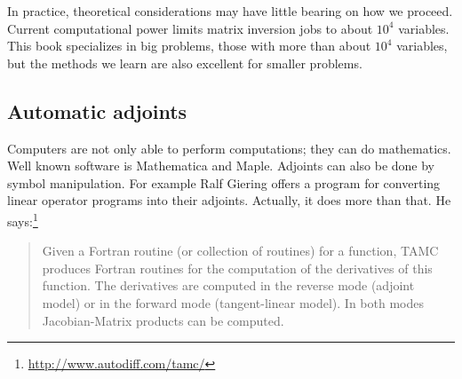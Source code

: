 \par
In practice, theoretical considerations may have little
bearing on how we proceed.
Current computational power limits matrix inversion
jobs to about $10^4$ variables.
This book specializes in big problems,
those with more than about $10^4$ variables,
but the methods we learn are also excellent for smaller problems.

\subsection{Automatic adjoints}
Computers are not only able to perform computations; they can do
mathematics.  Well known software is Mathematica and Maple.  Adjoints
can also be done by symbol manipulation.  For example
Ralf Giering
offers a program for converting linear operator programs into their
adjoints.
Actually, it does more than that.
He says:\footnote{\url{http://www.autodiff.com/tamc/}}
\begin{quote}
Given a Fortran routine (or collection of routines) for a function,
TAMC produces Fortran routines for the computation
of the derivatives of this function.
The derivatives are computed in the reverse mode (adjoint model)
or in the forward mode (tangent-linear model).
In both modes Jacobian-Matrix products can be computed.
\end{quote}


